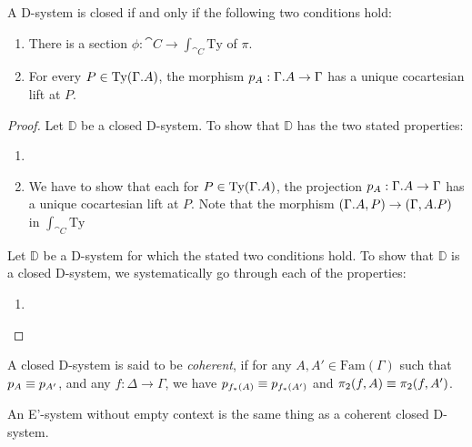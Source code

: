 \begin{lem}
A D-system is closed if and only if  the following two conditions hold:
\begin{enumerate}
\item There is a section $\phi:\cat{C}\to \int_{\cat{C}}\mathrm{Ty}$ of $\pi$.
\item For every $P\in\mathrm{Ty}(\ctxext{\Gamma}{A})$,
the morphism $p_A:\ctxext{\Gamma}{A}\to\Gamma$ has a unique cocartesian lift
at $P$.
\end{enumerate}
\end{lem}

\begin{proof}
Let $\mathbb{D}$ be a closed D-system. To show that $\mathbb{D}$ has the two
stated properties:
\begin{enumerate}
\item
\item We have to show that each for $P\in\mathrm{Ty}(\ctxext{\Gamma}{A})$,
the projection $p_A:\ctxext{\Gamma}{A}\to\Gamma$ has a unique cocartesian lift
at $P$. Note that the morphism $(\ctxext{\Gamma}{A},P)\to (\Gamma,\ctxext{A}{P})$
in $\int_{\cat{C}}\mathrm{Ty}$ 
\end{enumerate}

Let $\mathbb{D}$ be a D-system for which the stated two conditions hold. To show
that $\mathbb{D}$ is a closed D-system, we systematically go through each of the
properties:
\begin{enumerate}
\item 
\end{enumerate} 
\end{proof}

\begin{defn}
A closed D-system is said to be \emph{coherent}, if for any $A,A'\in\mathrm{Fam}(\Gamma)$
such that $p_A\equiv p_{A'}$, and any $f:\Delta\to\Gamma$, we have
$p_{f_\ast(A)}\equiv p_{f_\ast(A')}$ and $\pi_2(f,A)\equiv \pi_2(f,A')$.
\end{defn}

\begin{thm}
An E'-system without empty context is the same thing as a coherent closed D-system.
\end{thm}

